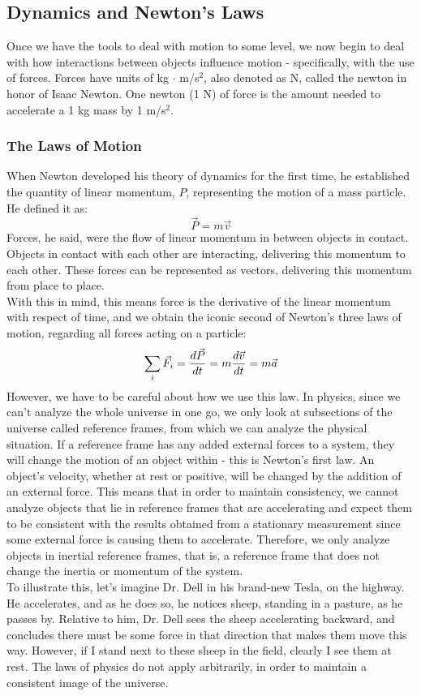 \subsection{Dynamics and Newton's Laws}
Once we have the tools to deal with motion to some level, we now begin to deal with how interactions between objects influence motion - specifically, with the use of forces. Forces have units of kg $\cdot$ m/s$^2$, also denoted as N, called the newton in honor of Isaac Newton. One newton (1 N) of force is the amount needed to accelerate a 1 kg mass by 1 m/s$^2$. 
\subsubsection{The Laws of Motion}
When Newton developed his theory of dynamics for the first time, he established the quantity of linear momentum, $P$, representing the motion of a mass particle. He defined it as:
\[
	\vec P = m \vec v
\]
Forces, he said, were the flow of linear momentum in between objects in contact. Objects in contact with each other are interacting, delivering this momentum to each other. These forces can be represented as vectors, delivering this momentum from place to place. \\
With this in mind, this means force is the derivative of the linear momentum with respect of time, and we obtain the iconic second of Newton's three laws of motion, regarding all forces acting on a particle:
\[
	\sum_i \vec F_i = \frac{d \vec P}{d t} = m \frac{d \vec v}{d t} = m \vec a
\]
However, we have to be careful about how we use this law. In physics, since we can't analyze the whole universe in one go, we only look at subsections of the universe called reference frames, from which we can analyze the physical situation. If a reference frame has any added external forces to a system, they will change the motion of an object within - this is Newton's first law. An object's velocity, whether at rest or positive, will be changed by the addition of an external force. This means that in order to maintain consistency, we cannot analyze objects that lie in reference frames that are accelerating and expect them to be consistent with the results obtained from a stationary measurement since some external force is causing them to accelerate. Therefore, we only analyze objects in inertial reference frames, that is, a reference frame that does not change the inertia or momentum of the system. \\
To illustrate this, let's imagine Dr. Dell in his brand-new Tesla, on the highway. He accelerates, and as he does so, he notices sheep, standing in a pasture, as he passes by. Relative to him, Dr. Dell sees the sheep accelerating backward, and concludes there must be some force in that direction that makes them move this way. However, if I stand next to these sheep in the field, clearly I see them at rest. The laws of physics do not apply arbitrarily, in order to maintain a consistent image of the universe.\\
